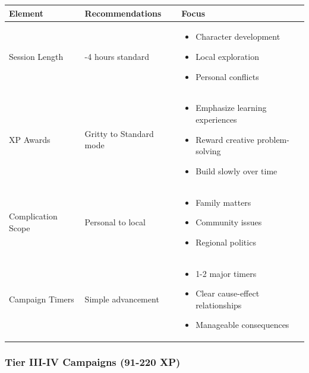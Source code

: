 \documentclass[11pt,letterpaper]{article}
\begin{document}
\begin{longtable}{|>{\raggedright\arraybackslash}p{3cm}|>{\raggedright\arraybackslash}p{4cm}|>{\raggedright\arraybackslash}p{5cm}|}
\hline
\textbf{Element} & \textbf{Recommendations} & \textbf{Focus} \\
\hline
Session Length & 3-4 hours standard & 
\begin{itemize}
    \item Character development
    \item Local exploration
    \item Personal conflicts
\end{itemize} \\
\hline
XP Awards & Gritty to Standard mode & 
\begin{itemize}
    \item Emphasize learning experiences
    \item Reward creative problem-solving
    \item Build slowly over time
\end{itemize} \\
\hline
Complication Scope & Personal to local & 
\begin{itemize}
    \item Family matters
    \item Community issues
    \item Regional politics
\end{itemize} \\
\hline
Campaign Timers & Simple advancement & 
\begin{itemize}
    \item 1-2 major timers
    \item Clear cause-effect relationships
    \item Manageable consequences
\end{itemize} \\
\hline
\end{longtable}

\subsubsection{Tier III-IV Campaigns (91-220 XP)}
\end{document}
